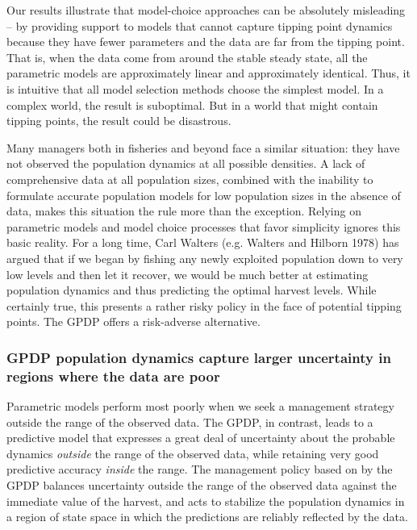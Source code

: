 \documentclass[author-year, 12pt,review]{components/elsarticle} %
\begin{document}
Our results illustrate that model-choice approaches can be absolutely
misleading -- by providing support to models that cannot capture tipping
point dynamics because they have fewer parameters and the data are far
from the tipping point. That is, when the data come from around the
stable steady state, all the parametric models are approximately linear
and approximately identical. Thus, it is intuitive that all model
selection methods choose the simplest model. In a complex world, the
result is suboptimal. But in a world that might contain tipping points,
the result could be disastrous.

Many managers both in fisheries and beyond face a similar situation:
they have not observed the population dynamics at all possible
densities. A lack of comprehensive data at all population sizes,
combined with the inability to formulate accurate population models for
low population sizes in the absence of data, makes this situation the
rule more than the exception. Relying on parametric models and model
choice processes that favor simplicity ignores this basic reality. For a
long time, Carl Walters (e.g. Walters and Hilborn 1978) has argued that
if we began by fishing any newly exploited population down to very low
levels and then let it recover, we would be much better at estimating
population dynamics and thus predicting the optimal harvest levels.
While certainly true, this presents a rather risky policy in the face of
potential tipping points. The GPDP offers a risk-adverse alternative.

\subsubsection{GPDP population dynamics capture larger uncertainty in
regions where the data are
poor}\label{gpdp-population-dynamics-capture-larger-uncertainty-in-regions-where-the-data-are-poor}

Parametric models perform most poorly when we seek a management strategy
outside the range of the observed data. The GPDP, in contrast, leads to
a predictive model that expresses a great deal of uncertainty about the
probable dynamics \emph{outside} the range of the observed data, while
retaining very good predictive accuracy \emph{inside} the range. The
management policy based on by the GPDP balances uncertainty outside the
range of the observed data against the immediate value of the harvest,
and acts to stabilize the population dynamics in a region of state space
in which the predictions are reliably reflected by the data.
\end{document}

